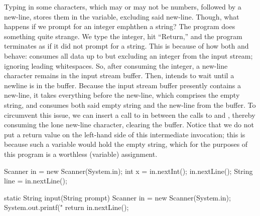 Typing in some characters, which may or may not be numbers, followed by a new-line, stores them in the  variable, excluding said new-line. Though, what happens if we prompt for an integer emph{then} a string? The program does something quite strange. We type the integer, hit ``Return,'' and the program terminates as if it did not prompt for a string. This is because of how both  and  behave:  consumes all data up to but excluding an integer from the input stream; ignoring leading whitespaces. So, after consuming the integer, a new-line character remains in the input stream buffer. Then,  intends to wait until a newline is in the buffer. Because the input stream buffer presently contains a new-line, it takes everything before the new-line, which comprises the empty string, and consumes both said empty string and the new-line from the buffer. To circumvent this issue, we can insert a call to  in between the calls to  and , thereby consuming the lone new-line character, clearing the buffer. Notice that we do not put a return value on the left-hand side of this intermediate  invocation; this is because such a variable would hold the empty string, which for the purposes of this program is a worthless (variable) assignment.

\begin{verbnobox}[\small]
Scanner in = new Scanner(System.in);
int x = in.nextInt();
in.nextLine();
String line = in.nextLine();
\end{verbnobox}


\begin{verbnobox}[\small]
static String input(String prompt) {
  Scanner in = new Scanner(System.in);
  System.out.printf("%
  return in.nextLine();
}
\end{verbnobox}

